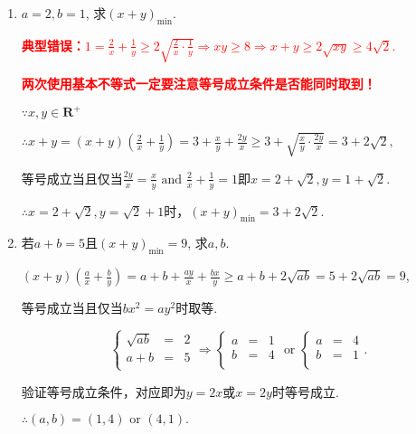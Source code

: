 \documentclass[8pt]{article}
\begin{document}
					\begin{enumerate}[label=(\arabic*)]
						\item $a=2, b=1$, 求$(x+y)_{\min}$.

							\textcolor{red}{\textbf{典型错误：$\displaystyle1=\frac{2}{x}+\frac{1}{y}\geq2\sqrt{\frac{2}{x}\cdot\frac{1}{y}}\Rightarrow xy\geq 8 \Rightarrow x+y\geq 2\sqrt{xy}\geq 4\sqrt{2}.$}}

							\textcolor{red}{\textbf{两次使用基本不等式一定要注意等号成立条件是否能同时取到！}}

							$\because x, y\in\mathbf{R}^{+}$

							$\therefore \displaystyle x+y=(x+y)\left(\frac{2}{x}+\frac{1}{y}\right)=3+\frac{x}{y}+\frac{2y}{x}\geq3+\sqrt{\frac{x}{y}\cdot\frac{2y}{x}}=3+2\sqrt{2},$

							等号成立当且仅当$\displaystyle \frac{2y}{x}=\frac{x}{y} \text{ and } \frac{2}{x}+\frac{1}{y}=1$即$x=2+\sqrt{2}, y=1+\sqrt{2}.$

							$\therefore x=2+\sqrt{2}, y=\sqrt{2}+1$时，$(x+y)_{\min}=3+2\sqrt{2}.$

						\item 若$a+b=5$且$(x+y)_{\min}=9$, 求$a, b$.

							$\displaystyle (x+y)\left(\frac{a}{x}+\frac{b}{y}\right)=a+b+\frac{ay}{x}+\frac{bx}{y}\geq a+b+2\sqrt{ab}=5+2\sqrt{ab}=9$,

							等号成立当且仅当$bx^2=ay^2$时取等.

							$$
							\left\{
							\begin{array}{rcl}
								\sqrt{ab}&=&2\\
								a+b&=&5\\
							\end{array}
							\right.
							\Rightarrow
							\left\{
							\begin{array}{rcl}
								a&=&1\\
								b&=&4\\
							\end{array}
							\right.
							\text{ or }
							\left\{
							\begin{array}{rcl}
								a&=&4\\
								b&=&1\\
							\end{array}
							\right..
							$$

							验证等号成立条件，对应即为$y=2x$或$x=2y$时等号成立.

							$\therefore (a,b)=(1,4) \text{ or } (4,1).$

					\end{enumerate}
\end{document}
